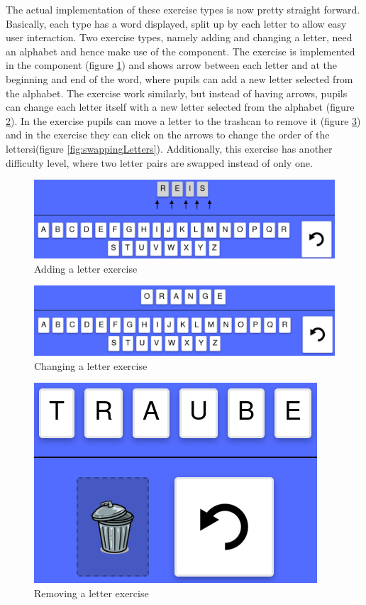 The actual implementation of these exercise types is now pretty straight forward. Basically, each type has a word displayed, split up by each letter to allow easy user interaction. Two exercise types, namely adding and changing a letter, need an alphabet and hence make use of the  component. The  exercise is implemented in the  component (figure \ref{fig:addingLetter}) and shows arrow between each letter and at the beginning and end of the word, where pupils can add a new letter selected from the alphabet. The  exercise work similarly, but instead of having arrows, pupils can change each letter itself with a new letter selected from the alphabet (figure \ref{fig:changingLetter}). In the  exercise pupils can move a letter to the trashcan to remove it (figure \ref{fig:removingLetter}) and in the  exercise they can click on the arrows to change the order of the lettersi(figure \ref{fig:swappingLetters}). Additionally, this exercise has another difficulty level, where two letter pairs are swapped instead of only one.

\begin{figure} 
  \centering
  \includegraphics[width=1.0 \columnwidth]{figures/words_add.png}
  \caption{Adding a letter exercise} 
  \label{fig:addingLetter} 
\end{figure}

\begin{figure} 
  \centering
  \includegraphics[width=1.0 \columnwidth]{figures/words_change.png}
  \caption{Changing a letter exercise} 
  \label{fig:changingLetter} 
\end{figure}

\begin{figure} 
  \centering
  \includegraphics[width=0.3 \columnwidth]{figures/words_remove.png}
  \caption{Removing a letter exercise} 
  \label{fig:removingLetter} 
\end{figure}

